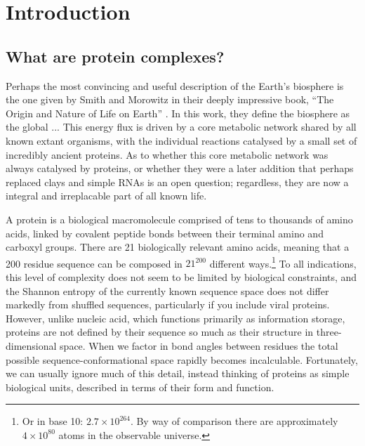 \documentclass[a4paper,11pt,twoside,openright]{scrbook}
\let\cite\supercite
\begin{document}
\chapter{Introduction}

\section{What are protein complexes?}
Perhaps the most convincing and useful description of the Earth's biosphere is the one given by Smith and Morowitz in their deeply impressive book, ``The Origin and Nature of Life on Earth'' \cite{Smith2016}. In this work, they define the biosphere as the global ... This energy flux is driven by a core metabolic network shared by all known extant organisms, with the individual reactions catalysed by a small set of incredibly ancient proteins. As to whether this core metabolic network was always catalysed by proteins, or whether they were a later addition that perhaps replaced clays and simple RNAs is an open question; regardless, they are now a integral and irreplacable part of all known life.


A protein is a biological macromolecule comprised of tens to thousands of amino acids, linked by covalent peptide bonds between their terminal amino and carboxyl groups. There are 21 biologically relevant amino acids, meaning that a 200 residue sequence can be composed in \(21^{200}\) different ways.\footnote{Or in base 10: \(2.7\times10^{264}\). By way of comparison there are approximately \(4\times10^{80}\) atoms in the observable universe.} To all indications, this level of complexity does not seem to be limited by biological constraints, and the Shannon entropy of the currently known sequence space does not differ markedly from shuffled sequences, particularly if you include viral proteins. However, unlike nucleic acid, which functions primarily as information storage, proteins are not defined by their sequence so much as their structure in three-dimensional space. When we factor in bond angles between residues the total possible sequence-conformational space rapidly becomes incalculable. Fortunately, we can usually ignore much of this detail, instead thinking of proteins as simple biological units, described in terms of their form and function.
\end{document}
